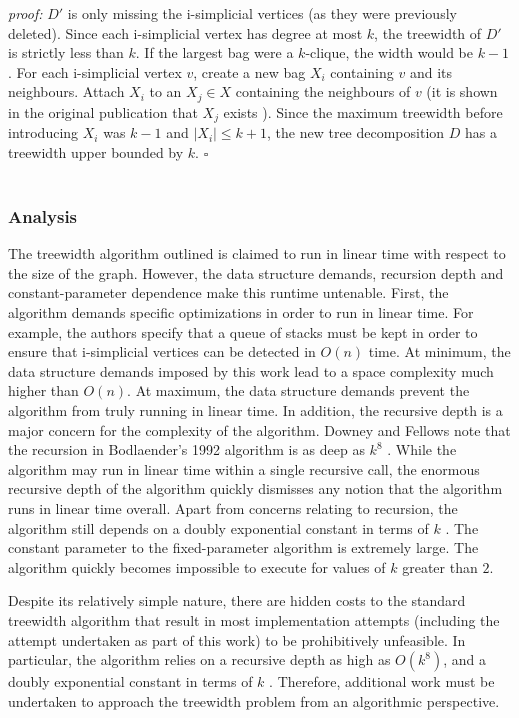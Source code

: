 \documentclass[12pt,conference]{IEEEtran}
\theoremstyle{plain}
\begin{document}
\textit{proof:} $D'$ is only missing the i-simplicial vertices (as they were previously deleted). Since each i-simplicial vertex has degree at most $k$, the treewidth of $D'$ is strictly less than $k$. If the largest bag were a $k$-clique, the width would be $k-1$. For each i-simplicial vertex $v$, create a new bag $X_{i}$ containing $v$ and its neighbours. Attach $X_{i}$ to an $X_{j} \in X$ containing the neighbours of $v$ (it is shown in the original publication that $X_{j}$ exists \cite{bodlaender-1992}). Since the maximum treewidth before introducing $X_{i}$ was $k-1$ and $|X_{i}| \leq k+1$, the new tree decomposition $D$ has a treewidth upper bounded by $k$. $\square$
\\
\\
\subsubsection{Analysis}

The treewidth algorithm outlined is claimed to run in linear time with respect to the size of the graph. However, the data structure demands, recursion depth and constant-parameter dependence make this runtime untenable. First, the algorithm demands specific optimizations in order to run in linear time. For example, the authors specify that a queue of stacks must be kept in order to ensure that i-simplicial vertices can be detected in $O(n)$ time. At minimum, the data structure demands imposed by this work lead to a space complexity much higher than $O(n)$. At maximum, the data structure demands prevent the algorithm from truly running in linear time. In addition, the recursive depth is a major concern for the complexity of the algorithm. Downey and Fellows note that the recursion in Bodlaender's 1992 algorithm is as deep as $k^{8}$ \cite{fellows-on-bodlaender}. While the algorithm may run in linear time within a single recursive call, the enormous recursive depth of the algorithm quickly dismisses any notion that the algorithm runs in linear time overall. Apart from concerns relating to recursion, the algorithm still depends on a doubly exponential constant in terms of $k$ \cite{fellows-on-bodlaender}. The constant parameter to the fixed-parameter algorithm is extremely large. The algorithm quickly becomes impossible to execute for values of $k$ greater than $2$.

Despite its relatively simple nature, there are hidden costs to the standard treewidth algorithm that result in most implementation attempts (including the attempt undertaken as part of this work) to be prohibitively unfeasible. In particular, the algorithm relies on a recursive depth as high as $O(k^{8})$, and a doubly exponential constant in terms of $k$ \cite{fellows-on-bodlaender}. Therefore, additional work must be undertaken to approach the treewidth problem from an algorithmic perspective. 
\end{document}
